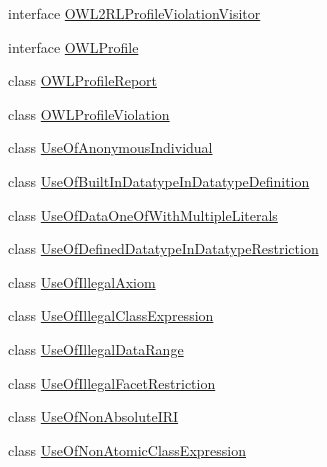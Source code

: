 \begin{DoxyCompactItemize}
\item 
interface \hyperlink{interfaceorg_1_1semanticweb_1_1owlapi_1_1profiles_1_1_o_w_l2_r_l_profile_violation_visitor}{O\-W\-L2\-R\-L\-Profile\-Violation\-Visitor}
\item 
interface \hyperlink{interfaceorg_1_1semanticweb_1_1owlapi_1_1profiles_1_1_o_w_l_profile}{O\-W\-L\-Profile}
\item 
class \hyperlink{classorg_1_1semanticweb_1_1owlapi_1_1profiles_1_1_o_w_l_profile_report}{O\-W\-L\-Profile\-Report}
\item 
class \hyperlink{classorg_1_1semanticweb_1_1owlapi_1_1profiles_1_1_o_w_l_profile_violation}{O\-W\-L\-Profile\-Violation}
\item 
class \hyperlink{classorg_1_1semanticweb_1_1owlapi_1_1profiles_1_1_use_of_anonymous_individual}{Use\-Of\-Anonymous\-Individual}
\item 
class \hyperlink{classorg_1_1semanticweb_1_1owlapi_1_1profiles_1_1_use_of_built_in_datatype_in_datatype_definition}{Use\-Of\-Built\-In\-Datatype\-In\-Datatype\-Definition}
\item 
class \hyperlink{classorg_1_1semanticweb_1_1owlapi_1_1profiles_1_1_use_of_data_one_of_with_multiple_literals}{Use\-Of\-Data\-One\-Of\-With\-Multiple\-Literals}
\item 
class \hyperlink{classorg_1_1semanticweb_1_1owlapi_1_1profiles_1_1_use_of_defined_datatype_in_datatype_restriction}{Use\-Of\-Defined\-Datatype\-In\-Datatype\-Restriction}
\item 
class \hyperlink{classorg_1_1semanticweb_1_1owlapi_1_1profiles_1_1_use_of_illegal_axiom}{Use\-Of\-Illegal\-Axiom}
\item 
class \hyperlink{classorg_1_1semanticweb_1_1owlapi_1_1profiles_1_1_use_of_illegal_class_expression}{Use\-Of\-Illegal\-Class\-Expression}
\item 
class \hyperlink{classorg_1_1semanticweb_1_1owlapi_1_1profiles_1_1_use_of_illegal_data_range}{Use\-Of\-Illegal\-Data\-Range}
\item 
class \hyperlink{classorg_1_1semanticweb_1_1owlapi_1_1profiles_1_1_use_of_illegal_facet_restriction}{Use\-Of\-Illegal\-Facet\-Restriction}
\item 
class \hyperlink{classorg_1_1semanticweb_1_1owlapi_1_1profiles_1_1_use_of_non_absolute_i_r_i}{Use\-Of\-Non\-Absolute\-I\-R\-I}
\item 
class \hyperlink{classorg_1_1semanticweb_1_1owlapi_1_1profiles_1_1_use_of_non_atomic_class_expression}{Use\-Of\-Non\-Atomic\-Class\-Expression}
\item 

\end{DoxyCompactItemize}
